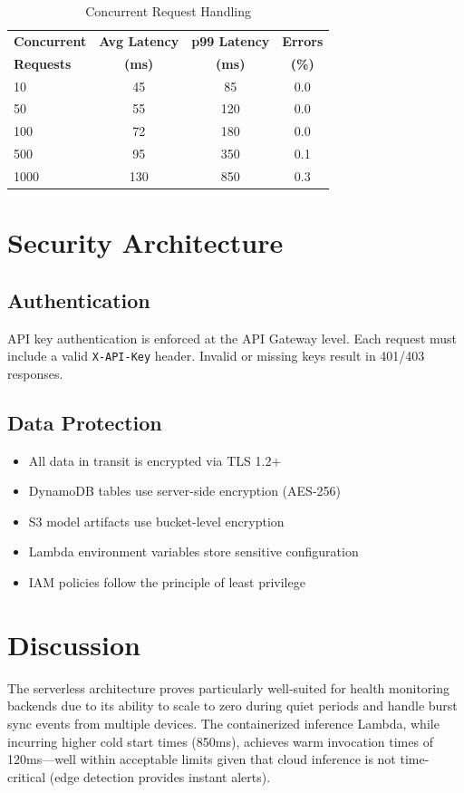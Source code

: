 \documentclass[conference]{IEEEtran}
\begin{document}
\begin{table}[H]
\centering
\caption{Concurrent Request Handling}
\label{tab:scalability}
\begin{tabular}{lccc}
\toprule
\textbf{Concurrent} & \textbf{Avg Latency} & \textbf{p99 Latency} & \textbf{Errors} \\
\textbf{Requests} & \textbf{(ms)} & \textbf{(ms)} & \textbf{(\%)} \\
\midrule
10 & 45 & 85 & 0.0 \\
50 & 55 & 120 & 0.0 \\
100 & 72 & 180 & 0.0 \\
500 & 95 & 350 & 0.1 \\
1000 & 130 & 850 & 0.3 \\
\bottomrule
\end{tabular}
\end{table}

\section{Security Architecture}

\subsection{Authentication}
API key authentication is enforced at the API Gateway level. Each request must include a valid \texttt{X-API-Key} header. Invalid or missing keys result in 401/403 responses.

\subsection{Data Protection}
\begin{itemize}
    \item All data in transit is encrypted via TLS 1.2+
    \item DynamoDB tables use server-side encryption (AES-256)
    \item S3 model artifacts use bucket-level encryption
    \item Lambda environment variables store sensitive configuration
    \item IAM policies follow the principle of least privilege
\end{itemize}

\section{Discussion}
The serverless architecture proves particularly well-suited for health monitoring backends due to its ability to scale to zero during quiet periods and handle burst sync events from multiple devices. The containerized inference Lambda, while incurring higher cold start times (850ms), achieves warm invocation times of 120ms---well within acceptable limits given that cloud inference is not time-critical (edge detection provides instant alerts).
\end{document}
